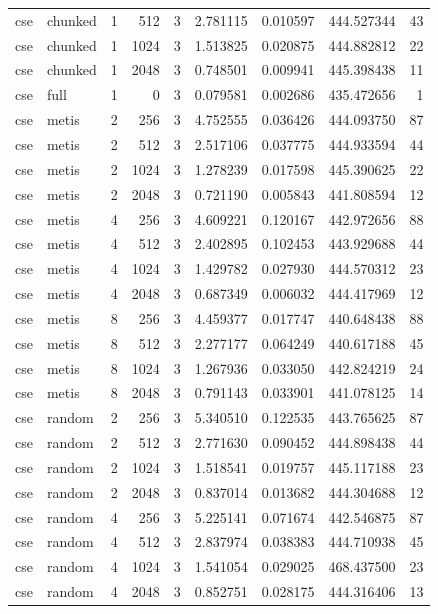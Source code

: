 \begin{tabular}{llrrrrrrr}
cse & chunked & 1 & 512 & 3 & 2.781115 & 0.010597 & 444.527344 & 43 \\
cse & chunked & 1 & 1024 & 3 & 1.513825 & 0.020875 & 444.882812 & 22 \\
cse & chunked & 1 & 2048 & 3 & 0.748501 & 0.009941 & 445.398438 & 11 \\
cse & full & 1 & 0 & 3 & 0.079581 & 0.002686 & 435.472656 & 1 \\
cse & metis & 2 & 256 & 3 & 4.752555 & 0.036426 & 444.093750 & 87 \\
cse & metis & 2 & 512 & 3 & 2.517106 & 0.037775 & 444.933594 & 44 \\
cse & metis & 2 & 1024 & 3 & 1.278239 & 0.017598 & 445.390625 & 22 \\
cse & metis & 2 & 2048 & 3 & 0.721190 & 0.005843 & 441.808594 & 12 \\
cse & metis & 4 & 256 & 3 & 4.609221 & 0.120167 & 442.972656 & 88 \\
cse & metis & 4 & 512 & 3 & 2.402895 & 0.102453 & 443.929688 & 44 \\
cse & metis & 4 & 1024 & 3 & 1.429782 & 0.027930 & 444.570312 & 23 \\
cse & metis & 4 & 2048 & 3 & 0.687349 & 0.006032 & 444.417969 & 12 \\
cse & metis & 8 & 256 & 3 & 4.459377 & 0.017747 & 440.648438 & 88 \\
cse & metis & 8 & 512 & 3 & 2.277177 & 0.064249 & 440.617188 & 45 \\
cse & metis & 8 & 1024 & 3 & 1.267936 & 0.033050 & 442.824219 & 24 \\
cse & metis & 8 & 2048 & 3 & 0.791143 & 0.033901 & 441.078125 & 14 \\
cse & random & 2 & 256 & 3 & 5.340510 & 0.122535 & 443.765625 & 87 \\
cse & random & 2 & 512 & 3 & 2.771630 & 0.090452 & 444.898438 & 44 \\
cse & random & 2 & 1024 & 3 & 1.518541 & 0.019757 & 445.117188 & 23 \\
cse & random & 2 & 2048 & 3 & 0.837014 & 0.013682 & 444.304688 & 12 \\
cse & random & 4 & 256 & 3 & 5.225141 & 0.071674 & 442.546875 & 87 \\
cse & random & 4 & 512 & 3 & 2.837974 & 0.038383 & 444.710938 & 45 \\
cse & random & 4 & 1024 & 3 & 1.541054 & 0.029025 & 468.437500 & 23 \\
cse & random & 4 & 2048 & 3 & 0.852751 & 0.028175 & 444.316406 & 13 \\

\end{tabular}
